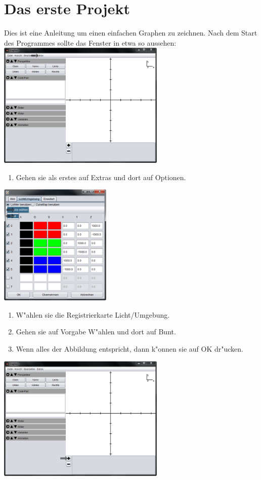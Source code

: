 \documentclass{scrartcl}
\begin{document}
\section{Das erste Projekt}
Dies ist eine Anleitung um einen einfachen Graphen zu zeichnen.\newline
Nach dem Start des Programmes sollte das Fenster in etwa so aussehen:\newline
\includegraphics[width=0.6\textwidth]{images/tutorial/interface1.png}
\begin{enumerate}
\item Gehen sie als erstes auf Extras und dort auf Optionen.
\end{enumerate}
\includegraphics[width=0.4\textwidth]{images/tutorial/options.png}
\begin{enumerate}
\item W"ahlen sie die Registrierkarte Licht/Umgebung.
\item Gehen sie auf Vorgabe W"ahlen und dort auf Bunt.
\item Wenn alles der Abbildung entspricht, dann k"onnen sie auf OK dr"ucken.
\end{enumerate}
\includegraphics[width=0.6\textwidth]{images/tutorial/interface2.png}
\end{document}
